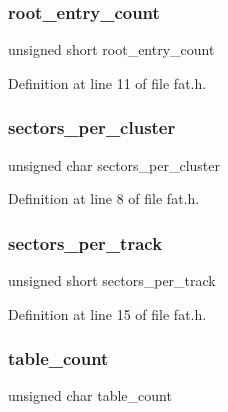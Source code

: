 \subsubsection{\texorpdfstring{root\+\_\+entry\+\_\+count}{root\_entry\_count}}
{\footnotesize\ttfamily unsigned short root\+\_\+entry\+\_\+count}



Definition at line 11 of file fat.\+h.

\mbox{\label{a00158_a78e26c23d518983e13881d4e0e53356a_a78e26c23d518983e13881d4e0e53356a}} 
\subsubsection{\texorpdfstring{sectors\+\_\+per\+\_\+cluster}{sectors\_per\_cluster}}
{\footnotesize\ttfamily unsigned char sectors\+\_\+per\+\_\+cluster}



Definition at line 8 of file fat.\+h.

\mbox{\label{a00158_a602ee4dea0c5142e60ebabb37adf3dd9_a602ee4dea0c5142e60ebabb37adf3dd9}} 
\subsubsection{\texorpdfstring{sectors\+\_\+per\+\_\+track}{sectors\_per\_track}}
{\footnotesize\ttfamily unsigned short sectors\+\_\+per\+\_\+track}



Definition at line 15 of file fat.\+h.

\mbox{\label{a00158_afc6604c21ae7038b249589ecd0560622_afc6604c21ae7038b249589ecd0560622}} 
\subsubsection{\texorpdfstring{table\+\_\+count}{table\_count}}
{\footnotesize\ttfamily unsigned char table\+\_\+count}




